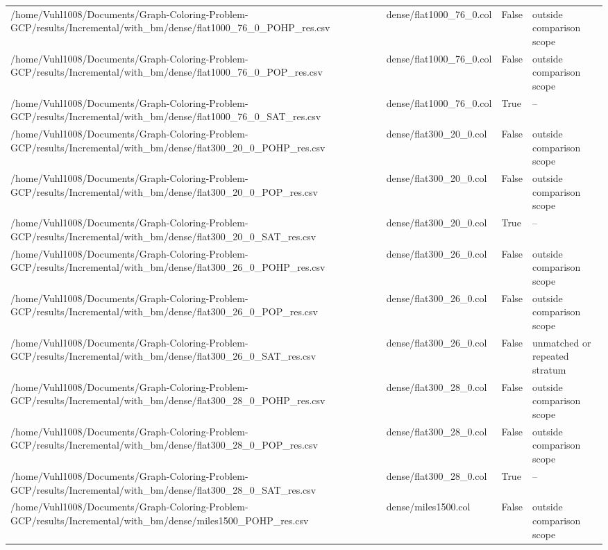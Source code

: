 \begin{table}[htbp]
\begin{tabular}{llll}
/home/Vuhl1008/Documents/Graph-Coloring-Problem-GCP/results/Incremental/with\_bm/dense/flat1000\_76\_0\_POHP\_res.csv & dense/flat1000\_76\_0.col & False & outside comparison scope \\
/home/Vuhl1008/Documents/Graph-Coloring-Problem-GCP/results/Incremental/with\_bm/dense/flat1000\_76\_0\_POP\_res.csv & dense/flat1000\_76\_0.col & False & outside comparison scope \\
/home/Vuhl1008/Documents/Graph-Coloring-Problem-GCP/results/Incremental/with\_bm/dense/flat1000\_76\_0\_SAT\_res.csv & dense/flat1000\_76\_0.col & True & -- \\
/home/Vuhl1008/Documents/Graph-Coloring-Problem-GCP/results/Incremental/with\_bm/dense/flat300\_20\_0\_POHP\_res.csv & dense/flat300\_20\_0.col & False & outside comparison scope \\
/home/Vuhl1008/Documents/Graph-Coloring-Problem-GCP/results/Incremental/with\_bm/dense/flat300\_20\_0\_POP\_res.csv & dense/flat300\_20\_0.col & False & outside comparison scope \\
/home/Vuhl1008/Documents/Graph-Coloring-Problem-GCP/results/Incremental/with\_bm/dense/flat300\_20\_0\_SAT\_res.csv & dense/flat300\_20\_0.col & True & -- \\
/home/Vuhl1008/Documents/Graph-Coloring-Problem-GCP/results/Incremental/with\_bm/dense/flat300\_26\_0\_POHP\_res.csv & dense/flat300\_26\_0.col & False & outside comparison scope \\
/home/Vuhl1008/Documents/Graph-Coloring-Problem-GCP/results/Incremental/with\_bm/dense/flat300\_26\_0\_POP\_res.csv & dense/flat300\_26\_0.col & False & outside comparison scope \\
/home/Vuhl1008/Documents/Graph-Coloring-Problem-GCP/results/Incremental/with\_bm/dense/flat300\_26\_0\_SAT\_res.csv & dense/flat300\_26\_0.col & False & unmatched or repeated stratum \\
/home/Vuhl1008/Documents/Graph-Coloring-Problem-GCP/results/Incremental/with\_bm/dense/flat300\_28\_0\_POHP\_res.csv & dense/flat300\_28\_0.col & False & outside comparison scope \\
/home/Vuhl1008/Documents/Graph-Coloring-Problem-GCP/results/Incremental/with\_bm/dense/flat300\_28\_0\_POP\_res.csv & dense/flat300\_28\_0.col & False & outside comparison scope \\
/home/Vuhl1008/Documents/Graph-Coloring-Problem-GCP/results/Incremental/with\_bm/dense/flat300\_28\_0\_SAT\_res.csv & dense/flat300\_28\_0.col & True & -- \\
/home/Vuhl1008/Documents/Graph-Coloring-Problem-GCP/results/Incremental/with\_bm/dense/miles1500\_POHP\_res.csv & dense/miles1500.col & False & outside comparison scope \\

\end{tabular}
\end{table}
